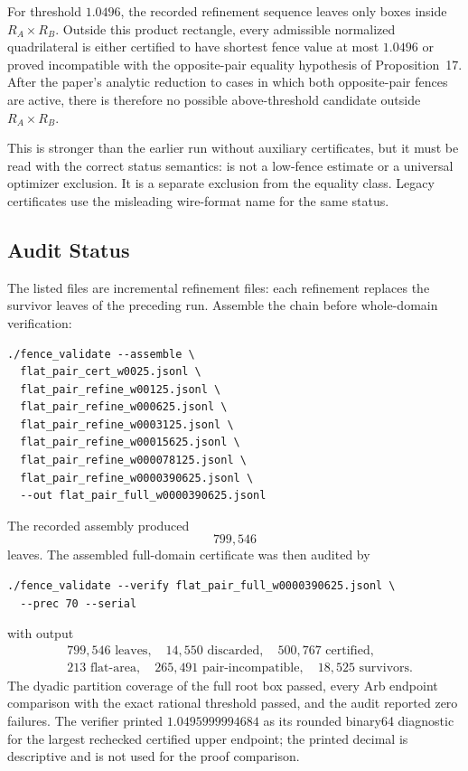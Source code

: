 \documentclass[11pt]{article}
\DeclareRobustCommand{\code}[1]{\texttt{\detokenize{#1}}}
\begin{document}
For threshold \(1.0496\), the recorded refinement sequence leaves only boxes inside
\(R_A\times R_B\).  Outside this product rectangle, every admissible normalized
quadrilateral is either certified to have shortest fence value at most
\(1.0496\) or proved incompatible with the opposite-pair equality hypothesis
of Proposition~17.  After the paper's analytic reduction to cases in which
both opposite-pair fences are active, there is therefore no possible
above-threshold candidate outside \(R_A\times R_B\).

This is stronger than the earlier run without auxiliary certificates, but it
must be read with the correct status semantics: \code{pair\_incompatible} is
not a low-fence estimate or a universal optimizer exclusion.  It is a separate
exclusion from the equality class.  Legacy certificates use the misleading
wire-format name \code{nonoptimal} for the same status.

\subsection{Audit Status}

The listed files are incremental refinement files: each refinement replaces the
survivor leaves of the preceding run.  Assemble the chain before whole-domain
verification:

\begin{lstlisting}
./fence_validate --assemble \
  flat_pair_cert_w0025.jsonl \
  flat_pair_refine_w00125.jsonl \
  flat_pair_refine_w000625.jsonl \
  flat_pair_refine_w0003125.jsonl \
  flat_pair_refine_w00015625.jsonl \
  flat_pair_refine_w000078125.jsonl \
  flat_pair_refine_w0000390625.jsonl \
  --out flat_pair_full_w0000390625.jsonl
\end{lstlisting}

The recorded assembly produced
\[
  799{,}546
\]
leaves.  The assembled full-domain certificate was then audited by

\begin{lstlisting}
./fence_validate --verify flat_pair_full_w0000390625.jsonl \
  --prec 70 --serial
\end{lstlisting}

with output
\[
\begin{aligned}
&799{,}546\text{ leaves},\quad 14{,}550\text{ discarded},\quad
500{,}767\text{ certified},\\
&213\text{ flat-area},\quad 265{,}491\text{ pair-incompatible},\quad
18{,}525\text{ survivors}.
\end{aligned}
\]
The dyadic partition coverage of the full root box passed, every Arb endpoint
comparison with the exact rational threshold passed, and the audit reported
zero failures.  The verifier printed
\(1.0495999994684\) as its rounded binary64 diagnostic for the largest
rechecked certified upper endpoint; the printed decimal is descriptive and is
not used for the proof comparison.
\end{document}
